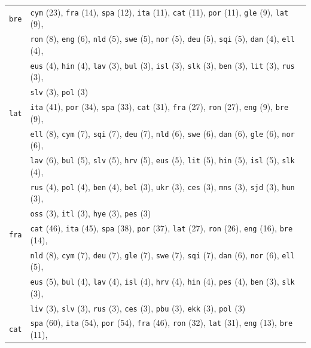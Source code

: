 \begin{center}
\begin{longtable}{ll}
\texttt{bre} & \texttt{cym} (23), \texttt{fra} (14), \texttt{spa} (12), \texttt{ita} (11), \texttt{cat} (11), \texttt{por} (11), \texttt{gle} (9), \texttt{lat} (9),\\
 & \texttt{ron} (8), \texttt{eng} (6), \texttt{nld} (5), \texttt{swe} (5), \texttt{nor} (5), \texttt{deu} (5), \texttt{sqi} (5), \texttt{dan} (4), \texttt{ell} (4),\\
 & \texttt{eus} (4), \texttt{hin} (4), \texttt{lav} (3), \texttt{bul} (3), \texttt{isl} (3), \texttt{slk} (3), \texttt{ben} (3), \texttt{lit} (3), \texttt{rus} (3),\\
 & \texttt{slv} (3), \texttt{pol} (3) \\
\texttt{lat} & \texttt{ita} (41), \texttt{por} (34), \texttt{spa} (33), \texttt{cat} (31), \texttt{fra} (27), \texttt{ron} (27), \texttt{eng} (9), \texttt{bre} (9),\\
 & \texttt{ell} (8), \texttt{cym} (7), \texttt{sqi} (7), \texttt{deu} (7), \texttt{nld} (6), \texttt{swe} (6), \texttt{dan} (6), \texttt{gle} (6), \texttt{nor} (6),\\
 & \texttt{lav} (6), \texttt{bul} (5), \texttt{slv} (5), \texttt{hrv} (5), \texttt{eus} (5), \texttt{lit} (5), \texttt{hin} (5), \texttt{isl} (5), \texttt{slk} (4),\\
 & \texttt{rus} (4), \texttt{pol} (4), \texttt{ben} (4), \texttt{bel} (3), \texttt{ukr} (3), \texttt{ces} (3), \texttt{mns} (3), \texttt{sjd} (3), \texttt{hun} (3),\\
 & \texttt{oss} (3), \texttt{itl} (3), \texttt{hye} (3), \texttt{pes} (3) \\
\texttt{fra} & \texttt{cat} (46), \texttt{ita} (45), \texttt{spa} (38), \texttt{por} (37), \texttt{lat} (27), \texttt{ron} (26), \texttt{eng} (16), \texttt{bre} (14),\\
 & \texttt{nld} (8), \texttt{cym} (7), \texttt{deu} (7), \texttt{gle} (7), \texttt{swe} (7), \texttt{sqi} (7), \texttt{dan} (6), \texttt{nor} (6), \texttt{ell} (5),\\
 & \texttt{eus} (5), \texttt{bul} (4), \texttt{lav} (4), \texttt{isl} (4), \texttt{hrv} (4), \texttt{hin} (4), \texttt{pes} (4), \texttt{ben} (3), \texttt{slk} (3),\\
 & \texttt{liv} (3), \texttt{slv} (3), \texttt{rus} (3), \texttt{ces} (3), \texttt{pbu} (3), \texttt{ekk} (3), \texttt{pol} (3) \\
\texttt{cat} & \texttt{spa} (60), \texttt{ita} (54), \texttt{por} (54), \texttt{fra} (46), \texttt{ron} (32), \texttt{lat} (31), \texttt{eng} (13), \texttt{bre} (11),\\

\end{longtable}
\end{center}
